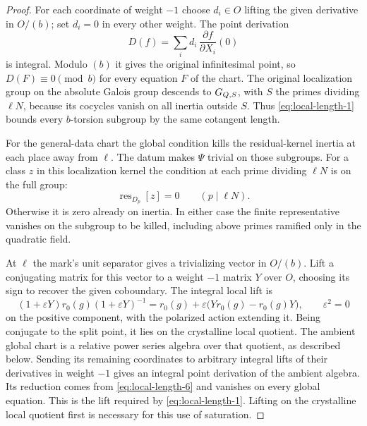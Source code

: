\begin{proof}
For each coordinate of weight \(-1\) choose \(d_i\in O\) lifting the given derivative in \(O/(b)\); set \(d_i=0\) in every other weight. The point derivation
\[
  D(f)=\sum_i d_i\,\frac{\partial f}{\partial X_i}(0)
\]
is integral. Modulo \((b)\) it gives the original infinitesimal point, so \(D(F)\equiv0\pmod b\) for every equation \(F\) of the chart. The original
localization group on the absolute Galois group
descends to \(G_{Q,S}\), with \(S\) the primes dividing
\(\ell N\), because its cocycles vanish on all inertia
outside \(S\). Thus \eqref{eq:local-length-1} bounds every \(b\)-torsion
subgroup by the same cotangent length.

For the general-data chart the global condition kills
the residual-kernel inertia at each place away from
\(\ell\). The datum makes \(\Psi\) trivial on those
subgroups. For a class \(z\) in this localization kernel the condition at each prime dividing \(\ell N\) is on the full group:
\[
 \operatorname{res}_{D_p}[z]=0\qquad(p\mid\ell N).
\] Otherwise it is zero already on
inertia. In either case the finite representative vanishes
on the subgroup to be killed, including above primes
ramified only in the quadratic field.

At \(\ell\) the mark's unit separator gives a trivializing vector in \(O/(b)\). Lift a conjugating matrix for this vector to a weight \(-1\) matrix \(Y\) over \(O\), choosing its sign to recover the given coboundary. The integral local lift is
\[
 (1+\varepsilon Y)r_0(g)(1+\varepsilon Y)^{-1}
    =r_0(g)+\varepsilon\bigl(Yr_0(g)-r_0(g)Y\bigr),
       \qquad \varepsilon^2=0
\]
on the positive component, with the polarized action extending it. Being conjugate to the split point, it lies on the crystalline local quotient. The ambient global chart is a relative
power series algebra over that quotient, as described
below. Sending its remaining coordinates to arbitrary
integral lifts of their derivatives in weight \(-1\)
gives an integral point derivation of the ambient algebra.
Its reduction comes from \eqref{eq:local-length-6} and vanishes on every
global equation. This is the lift required by \eqref{eq:local-length-1}.
Lifting on the crystalline local quotient first is
necessary for this use of saturation.


\end{proof}
